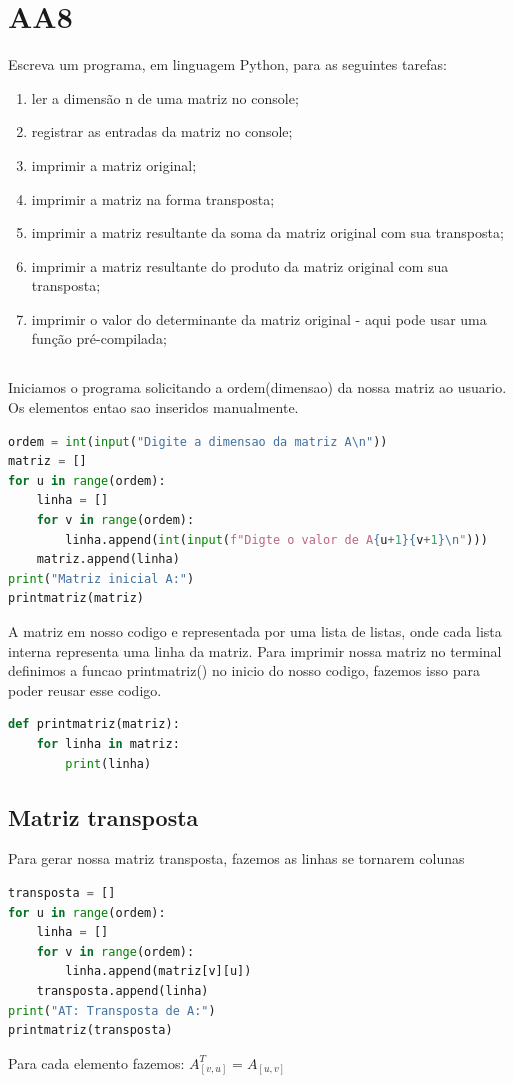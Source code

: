 \documentclass{article}
\begin{document}
\section{AA8}
Escreva um programa, em linguagem Python, para as seguintes tarefas:
\begin{enumerate}
    \item ler a dimensão n de uma matriz no console;
    \item registrar as entradas da matriz no console;
    \item imprimir a matriz original;
    \item imprimir a matriz na forma transposta;
    \item imprimir a matriz resultante da soma da matriz original com sua transposta;
    \item imprimir a matriz resultante do produto da matriz original com sua transposta;
    \item imprimir o valor do determinante da matriz original - aqui pode usar uma função pré-compilada;
    
\end{enumerate}
\subsection{}

Iniciamos o programa solicitando a ordem(dimensao) da nossa matriz ao usuario. Os elementos entao sao inseridos manualmente. 
\begin{lstlisting}[language=python]
ordem = int(input("Digite a dimensao da matriz A\n"))
matriz = []
for u in range(ordem):
    linha = []
    for v in range(ordem):
        linha.append(int(input(f"Digte o valor de A{u+1}{v+1}\n")))
    matriz.append(linha)
print("Matriz inicial A:")
printmatriz(matriz)
\end{lstlisting}
A matriz em nosso codigo e representada por uma lista de listas, onde cada lista interna representa uma linha da matriz.
Para imprimir nossa matriz no terminal definimos a funcao printmatriz() no inicio do nosso codigo, fazemos isso para poder reusar esse codigo.
\begin{lstlisting}[language=python]
def printmatriz(matriz):
    for linha in matriz:
        print(linha)
\end{lstlisting}

\subsection{Matriz transposta}
Para gerar nossa matriz transposta, fazemos as linhas se tornarem colunas
\begin{lstlisting}[language=Python]
transposta = []
for u in range(ordem):
    linha = []
    for v in range(ordem):
        linha.append(matriz[v][u])
    transposta.append(linha)
print("AT: Transposta de A:")
printmatriz(transposta)
\end{lstlisting}
Para cada elemento fazemos:
$A^T_{[v,u]} = A_{[u,v]}$
\end{document}
